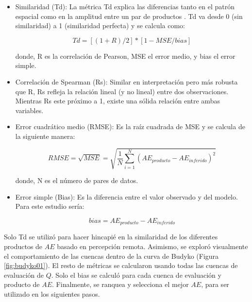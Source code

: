 \documentclass[12pt]{article}
\begin{document}
\begin{itemize}

	\item Similaridad (Td): La métrica Td explica las diferencias tanto en el patrón espacial como en la amplitud entre un par de productos \citep{Tian2017}. Td va desde 0 (sin similaridad) a 1 (similaridad perfecta) y se calcula como:
	
	\begin{equation}
    Td = [(1 + R) / 2]*[1 - MSE/bias]
    \end{equation}
    
    donde, R es la correlación de Pearson, MSE el error medio, y bias el error simple.
    
	\item Correlación de Spearman (Rs): Similar en interpretación pero más robusta que R, Rs refleja la relación lineal (y no lineal) entre dos observaciones. Mientras Rs este próximo a 1, existe una sólida relación entre ambas variables.
	
	\item Error cuadrático medio (RMSE): Es la raíz cuadrada de MSE y se calcula de la siguiente manera:
	
    \begin{equation}
        RMSE = \sqrt{MSE} = \sqrt{\frac{1}{N} \sum_{i=1}^{N}(AE_{producto}-AE_{inferido})^{2}}
    \end{equation}
    
    donde, N es el número de pares de datos.
    
	\item Error simple (Bias): Es la diferencia entre el valor observado y del modelo. Para este estudio sería:
	
    \begin{equation}
        bias = AE_{producto}-AE_{inferido}
    \end{equation}
	
\end{itemize}

Solo Td se utilizó para hacer hincapié en la similaridad de los diferentes productos de $AE$ basado en percepción remota. Asimismo, se exploró visualmente el comportamiento de las cuencas dentro de la curva de Budyko (Figura \ref{fig:budyko01}). El resto de métricas se calcularon usando todas las cuencas de evaluación de $Q$. Solo el bias se calculó para cada cuenca de evaluación y producto de $AE$. Finalmente, se ranquea y selecciona el mejor $AE$, para ser utilizado en los siguientes pasos.
\end{document}
